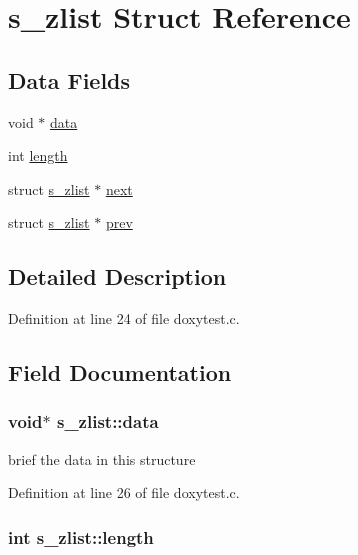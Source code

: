 \hypertarget{structs__zlist}{\section{s\+\_\+zlist Struct Reference}
\label{structs__zlist}
}
\subsection*{Data Fields}
\begin{DoxyCompactItemize}
\item 
void $\ast$ \hyperlink{structs__zlist_acee381ab11cad7679b76d3eb5abeed5c}{data}
\item 
int \hyperlink{structs__zlist_ab478c3bc57d120b65ba3eb6d40b8e8f0}{length}
\item 
struct \hyperlink{structs__zlist}{s\+\_\+zlist} $\ast$ \hyperlink{structs__zlist_ab48eb89251a032aff475bdee2f0c77e2}{next}
\item 
struct \hyperlink{structs__zlist}{s\+\_\+zlist} $\ast$ \hyperlink{structs__zlist_a0b063f3a99ed0102cbd29a6271153208}{prev}
\end{DoxyCompactItemize}


\subsection{Detailed Description}


Definition at line 24 of file doxytest.\+c.



\subsection{Field Documentation}
\hypertarget{structs__zlist_acee381ab11cad7679b76d3eb5abeed5c}{
\subsubsection[{data}]{\setlength{\rightskip}{0pt plus 5cm}void$\ast$ s\+\_\+zlist\+::data}}\label{structs__zlist_acee381ab11cad7679b76d3eb5abeed5c}


brief the data in this structure 



Definition at line 26 of file doxytest.\+c.

\hypertarget{structs__zlist_ab478c3bc57d120b65ba3eb6d40b8e8f0}{
\subsubsection[{length}]{\setlength{\rightskip}{0pt plus 5cm}int s\+\_\+zlist\+::length}}\label{structs__zlist_ab478c3bc57d120b65ba3eb6d40b8e8f0}


